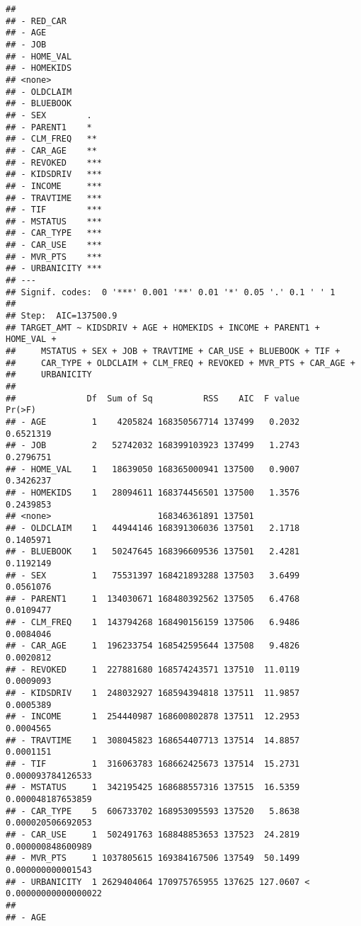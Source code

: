 \documentclass[
]{article}
\begin{document}
\begin{verbatim}
##                 
## - RED_CAR       
## - AGE           
## - JOB           
## - HOME_VAL      
## - HOMEKIDS      
## <none>          
## - OLDCLAIM      
## - BLUEBOOK      
## - SEX        .  
## - PARENT1    *  
## - CLM_FREQ   ** 
## - CAR_AGE    ** 
## - REVOKED    ***
## - KIDSDRIV   ***
## - INCOME     ***
## - TRAVTIME   ***
## - TIF        ***
## - MSTATUS    ***
## - CAR_TYPE   ***
## - CAR_USE    ***
## - MVR_PTS    ***
## - URBANICITY ***
## ---
## Signif. codes:  0 '***' 0.001 '**' 0.01 '*' 0.05 '.' 0.1 ' ' 1
## 
## Step:  AIC=137500.9
## TARGET_AMT ~ KIDSDRIV + AGE + HOMEKIDS + INCOME + PARENT1 + HOME_VAL + 
##     MSTATUS + SEX + JOB + TRAVTIME + CAR_USE + BLUEBOOK + TIF + 
##     CAR_TYPE + OLDCLAIM + CLM_FREQ + REVOKED + MVR_PTS + CAR_AGE + 
##     URBANICITY
## 
##              Df  Sum of Sq          RSS    AIC  F value                Pr(>F)
## - AGE         1    4205824 168350567714 137499   0.2032             0.6521319
## - JOB         2   52742032 168399103923 137499   1.2743             0.2796751
## - HOME_VAL    1   18639050 168365000941 137500   0.9007             0.3426237
## - HOMEKIDS    1   28094611 168374456501 137500   1.3576             0.2439853
## <none>                     168346361891 137501                               
## - OLDCLAIM    1   44944146 168391306036 137501   2.1718             0.1405971
## - BLUEBOOK    1   50247645 168396609536 137501   2.4281             0.1192149
## - SEX         1   75531397 168421893288 137503   3.6499             0.0561076
## - PARENT1     1  134030671 168480392562 137505   6.4768             0.0109477
## - CLM_FREQ    1  143794268 168490156159 137506   6.9486             0.0084046
## - CAR_AGE     1  196233754 168542595644 137508   9.4826             0.0020812
## - REVOKED     1  227881680 168574243571 137510  11.0119             0.0009093
## - KIDSDRIV    1  248032927 168594394818 137511  11.9857             0.0005389
## - INCOME      1  254440987 168600802878 137511  12.2953             0.0004565
## - TRAVTIME    1  308045823 168654407713 137514  14.8857             0.0001151
## - TIF         1  316063783 168662425673 137514  15.2731     0.000093784126533
## - MSTATUS     1  342195425 168688557316 137515  16.5359     0.000048187653859
## - CAR_TYPE    5  606733702 168953095593 137520   5.8638     0.000020506692053
## - CAR_USE     1  502491763 168848853653 137523  24.2819     0.000000848600989
## - MVR_PTS     1 1037805615 169384167506 137549  50.1499     0.000000000001543
## - URBANICITY  1 2629404064 170975765955 137625 127.0607 < 0.00000000000000022
##                 
## - AGE           

\end{verbatim}
\end{document}
